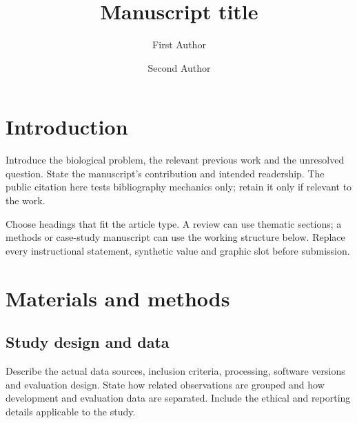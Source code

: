 \documentclass[unnumsec,webpdf,contemporary,large]{oup-authoring-template}
\begin{document}
\DOI{}
\copyrightyear{}
\pubyear{}

\title[Short manuscript title]{Manuscript title}
\author[1,$\ast$]{First Author}
\author[1,2]{Second Author}
\address[1]{, ,
  }
\address[2]{, ,
  }

\maketitle
\thispagestyle{plain}
\pagestyle{plain}

\section{Introduction}\label{sec:introduction}
Introduce the biological problem, the relevant previous work and the
unresolved question. State the manuscript's contribution and intended
readership. The public citation here tests bibliography mechanics only;
retain it only if relevant to the work\cite{wilkinson2016fair}.

Choose headings that fit the article type. A review can use thematic
sections; a methods or case-study manuscript can use the working structure
below. Replace every instructional statement, synthetic value and graphic
slot before submission.

\section{Materials and methods}\label{sec:methods}
\subsection{Study design and data}
Describe the actual data sources, inclusion criteria, processing, software
versions and evaluation design. State how related observations are grouped
and how development and evaluation data are separated. Include the ethical
and reporting details applicable to the study.
\end{document}
